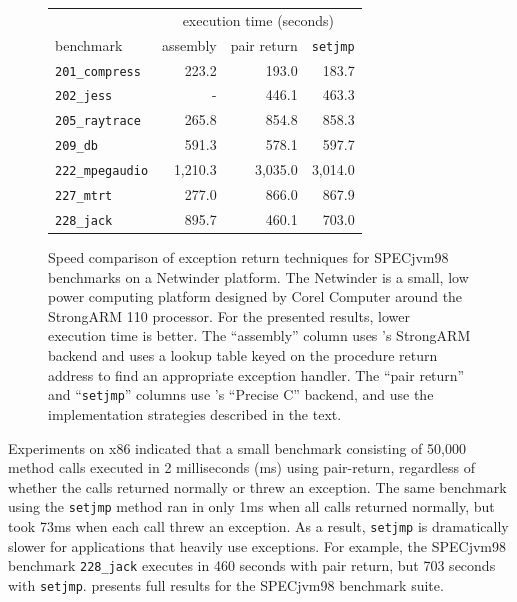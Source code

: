 
\begin{figure}\sis
\begin{center}
\begin{tabular}{lrrr}
          &\multicolumn{3}{c}{execution time (seconds)} \\
benchmark &\multicolumn{1}{c}{assembly}
          &\multicolumn{1}{c}{pair return}
          &\multicolumn{1}{c}{\texttt{setjmp}} \\ \hline
{\tt 201\_compress} &    223.2 &   193.0 &   183.7 \\
{\tt 202\_jess}     &        - &   446.1 &   463.3 \\
{\tt 205\_raytrace} &    265.8 &   854.8 &   858.3 \\
{\tt 209\_db}       &    591.3 &   578.1 &   597.7 \\
{\tt 222\_mpegaudio}&  1,210.3 & 3,035.0 & 3,014.0 \\
{\tt 227\_mtrt}     &    277.0 &   866.0 &   867.9 \\
{\tt 228\_jack}     &    895.7 &   460.1 &   703.0 \\
\end{tabular}
\end{center}
\caption[Speed comparison of exception return techniques for SPECjvm98
  benchmarks.]
{Speed comparison of exception return techniques for SPECjvm98
  benchmarks on a Netwinder platform.
  The Netwinder is a small, low power computing platform
  designed by Corel Computer around the StrongARM 110 processor.
  For the presented results, lower execution time is better.
  The ``assembly'' column uses \flex's StrongARM backend and uses a lookup
  table keyed on the procedure return address to find an appropriate
  exception handler.  The ``pair return'' and ``\texttt{setjmp}''
  columns use \flex's ``Precise C'' backend, and use the
  implementation strategies described in the text.}
\label{fig:setjmp}
\end{figure}

Experiments on x86 indicated that
a small benchmark consisting of 50,000 method calls executed in
2 milliseconds (ms) using pair-return, regardless of whether the calls
returned normally or threw an exception.  The same benchmark
using the \texttt{setjmp} method ran in only 
1ms when all calls returned normally, but took 73ms when
each call threw an exception. As a result,
\texttt{setjmp} is dramatically slower for applications that heavily use
exceptions.  For example, the SPECjvm98 benchmark \texttt{228\_jack}
executes in 460 seconds with pair return, but 703 seconds with
\texttt{setjmp}.   presents full results for the
SPECjvm98 benchmark suite.

